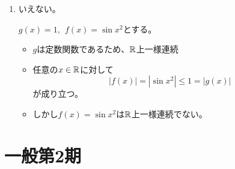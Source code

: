\documentclass[dvipdfmx]{jsreport}
\begin{document}
\begin{souanswer}
\begin{enumerate}
\begin{tcolorbox}
    ある$\epsilon_0> 0$が存在して、任意の$\delta > 0$に対して、ある点対$x, y\in \R$が存在して、$|x- y|< \delta$かつ$|f(x)- f(y)|\ge \epsilon_0$を満たす。
\end{tcolorbox}
    $\epsilon_0= 1$とする。各自然数$n\in \N$に対し、
\begin{equation*}
    x_n= \sqrt{2n\pi+ \frac{\pi}{2}},\ \ y_n= \sqrt{2n\pi}
\end{equation*}
    とおく。このとき
\begin{equation*}
    f(x_n)= \sin{\left(2n\pi+ \frac{\pi}{2}\right)}= 1,\ \ f(y_n)= \sin{2n\pi}= 0
\end{equation*}
    より
\begin{equation*}
    |f(x_n)- f(y_n)|= |1- 0|= 1\ge \epsilon_0
\end{equation*}
    となる。一方で2点間の距離は
\begin{align*}
    |x_n- y_n|
    &= \sqrt{2n\pi+ \frac{\pi}{2}}- \sqrt{2n\pi}\\
    &= \frac{\pi/2}{\sqrt{2n\pi+ \frac{\pi}{2}}+ \sqrt{2n\pi}}
\end{align*}
    と評価でき、$n\to +\infty$のとき、$|x_n- y_n|\to 0$。したがって任意の$\delta> 0$に対して十分大きな$n$を選べば、$|x_n- y_n|< \delta$かつ$|f(x_n)- f(y_n)|\ge 1$をみたす点対が取れるため、$f$は$\R$上一様連続ではない。
    \item いえない。
\begin{tcolorbox}[title= 反例]
    $g(x)= 1,\ \ f(x)= \sin{x^2}$とする。
\begin{itemize}
    \item $g$は定数関数であるため、$\R$上一様連続
    \item 任意の$x\in \mathbb{R}$に対して
\begin{equation*}
    |f(x)|= |\sin{x^2}|\le 1= |g(x)|
\end{equation*}
    が成り立つ。
    \item しかし$f(x)= \sin{x^2}$は$\R$上一様連続でない。
\end{itemize}
\end{tcolorbox}
\end{enumerate}
\end{souanswer}
\chapter{一般第2期}
\end{document}
